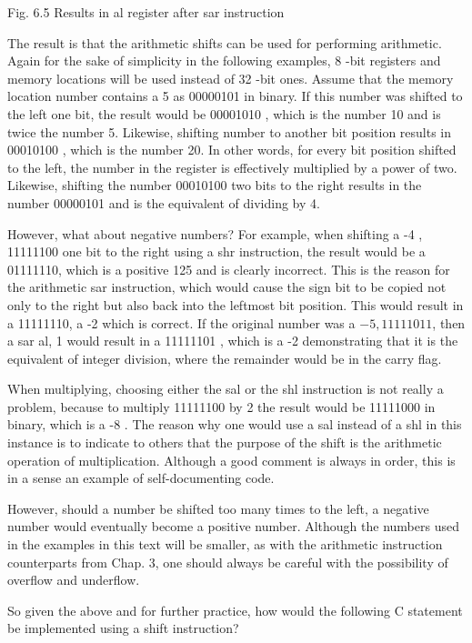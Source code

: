 \documentclass[10pt]{article}
\begin{document}
Fig. 6.5 Results in al register after sar instruction

The result is that the arithmetic shifts can be used for performing arithmetic. Again for the sake of simplicity in the following examples, 8 -bit registers and memory locations will be used instead of 32 -bit ones. Assume that the memory location number contains a 5 as 00000101 in binary. If this number was shifted to the left one bit, the result would be 00001010 , which is the number 10 and is twice the number 5. Likewise, shifting number to another bit position results in 00010100 , which is the number 20. In other words, for every bit position shifted to the left, the number in the register is effectively multiplied by a power of two. Likewise, shifting the number 00010100 two bits to the right results in the number 00000101 and is the equivalent of dividing by 4.

However, what about negative numbers? For example, when shifting a -4 , 11111100 one bit to the right using a shr instruction, the result would be a 01111110, which is a positive 125 and is clearly incorrect. This is the reason for the arithmetic sar instruction, which would cause the sign bit to be copied not only to the right but also back into the leftmost bit position. This would result in a 11111110, a -2 which is correct. If the original number was a $-5,11111011$, then a sar al, 1 would result in a 11111101 , which is a -2 demonstrating that it is the equivalent of integer division, where the remainder would be in the carry flag.

When multiplying, choosing either the sal or the shl instruction is not really a problem, because to multiply 11111100 by 2 the result would be 11111000 in binary, which is a -8 . The reason why one would use a sal instead of a shl in this instance is to indicate to others that the purpose of the shift is the arithmetic operation of multiplication. Although a good comment is always in order, this is in a sense an example of self-documenting code.

However, should a number be shifted too many times to the left, a negative number would eventually become a positive number. Although the numbers used in the examples in this text will be smaller, as with the arithmetic instruction counterparts from Chap. 3, one should always be careful with the possibility of overflow and underflow.

So given the above and for further practice, how would the following C statement be implemented using a shift instruction?
\end{document}
